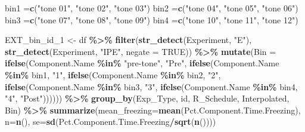 \documentclass[
]{article}
\newenvironment{Shaded}{\begin{snugshade}}{\end{snugshade}}
\newcommand{\AttributeTok}[1]{\textcolor[rgb]{0.13,0.29,0.53}{#1}}
\newcommand{\ConstantTok}[1]{\textcolor[rgb]{0.56,0.35,0.01}{#1}}
\newcommand{\FunctionTok}[1]{\textcolor[rgb]{0.13,0.29,0.53}{\textbf{#1}}}
\newcommand{\NormalTok}[1]{#1}
\newcommand{\OtherTok}[1]{\textcolor[rgb]{0.56,0.35,0.01}{#1}}
\newcommand{\SpecialCharTok}[1]{\textcolor[rgb]{0.81,0.36,0.00}{\textbf{#1}}}
\newcommand{\StringTok}[1]{\textcolor[rgb]{0.31,0.60,0.02}{#1}}
\begin{document}
\begin{Shaded}
\begin{Highlighting}[]
\NormalTok{bin1 }\OtherTok{=}\FunctionTok{c}\NormalTok{(}\StringTok{"tone 01"}\NormalTok{, }\StringTok{"tone 02"}\NormalTok{, }\StringTok{"tone 03"}\NormalTok{)}
\NormalTok{bin2 }\OtherTok{=}\FunctionTok{c}\NormalTok{(}\StringTok{"tone 04"}\NormalTok{, }\StringTok{"tone 05"}\NormalTok{, }\StringTok{"tone 06"}\NormalTok{)}
\NormalTok{bin3 }\OtherTok{=}\FunctionTok{c}\NormalTok{(}\StringTok{"tone 07"}\NormalTok{, }\StringTok{"tone 08"}\NormalTok{, }\StringTok{"tone 09"}\NormalTok{)}
\NormalTok{bin4 }\OtherTok{=}\FunctionTok{c}\NormalTok{(}\StringTok{"tone 10"}\NormalTok{, }\StringTok{"tone 11"}\NormalTok{, }\StringTok{"tone 12"}\NormalTok{)}

\NormalTok{EXT\_bin\_id\_1 }\OtherTok{\textless{}{-}}\NormalTok{ df }\SpecialCharTok{\%\textgreater{}\%} 
  \FunctionTok{filter}\NormalTok{(}\FunctionTok{str\_detect}\NormalTok{(Experiment, }\StringTok{"E"}\NormalTok{),}
         \FunctionTok{str\_detect}\NormalTok{(Experiment, }\StringTok{"IPE"}\NormalTok{, }\AttributeTok{negate =} \ConstantTok{TRUE}\NormalTok{)) }\SpecialCharTok{\%\textgreater{}\%} 
  \FunctionTok{mutate}\NormalTok{(}\AttributeTok{Bin =} \FunctionTok{ifelse}\NormalTok{(Component.Name }\SpecialCharTok{\%in\%} \StringTok{"pre{-}tone"}\NormalTok{, }\StringTok{"Pre"}\NormalTok{,}
                      \FunctionTok{ifelse}\NormalTok{(Component.Name }\SpecialCharTok{\%in\%}\NormalTok{ bin1, }\StringTok{"1"}\NormalTok{,}
                             \FunctionTok{ifelse}\NormalTok{(Component.Name }\SpecialCharTok{\%in\%}\NormalTok{ bin2, }\StringTok{"2"}\NormalTok{,}
                                    \FunctionTok{ifelse}\NormalTok{(Component.Name }\SpecialCharTok{\%in\%}\NormalTok{ bin3, }\StringTok{"3"}\NormalTok{,}
                                           \FunctionTok{ifelse}\NormalTok{(Component.Name }\SpecialCharTok{\%in\%}\NormalTok{ bin4, }\StringTok{"4"}\NormalTok{, }\StringTok{"Post"}\NormalTok{)))))) }\SpecialCharTok{\%\textgreater{}\%} 
  \FunctionTok{group\_by}\NormalTok{(Exp\_Type, id, R\_Schedule, Interpolated, Bin) }\SpecialCharTok{\%\textgreater{}\%} 
  \FunctionTok{summarize}\NormalTok{(}\AttributeTok{mean\_freezing=}\FunctionTok{mean}\NormalTok{(Pct.Component.Time.Freezing), }\AttributeTok{n=}\FunctionTok{n}\NormalTok{(),}
            \AttributeTok{se=}\FunctionTok{sd}\NormalTok{(Pct.Component.Time.Freezing}\SpecialCharTok{/}\FunctionTok{sqrt}\NormalTok{(}\FunctionTok{n}\NormalTok{())))}
\end{Highlighting}
\end{Shaded}
\end{document}
